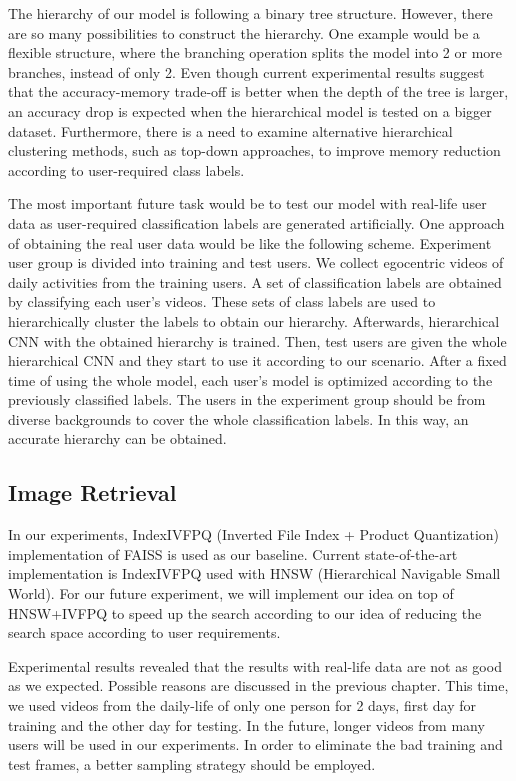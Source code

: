The hierarchy of our model is following a binary tree structure. 
However, there are so many possibilities to construct the hierarchy. 
One example would be a flexible structure, where the branching operation splits the model into 2 or more branches, instead of only 2. 
Even though current experimental results suggest that the accuracy-memory trade-off is better when the depth of the tree is larger, an accuracy drop is expected when the hierarchical model is tested on a bigger dataset.
Furthermore, there is a need to examine alternative hierarchical clustering methods, such as top-down approaches, to improve memory reduction according to user-required class labels.

The most important future task would be to test our model with real-life user data as user-required classification labels are generated artificially.
One approach of obtaining the real user data would be like the following scheme.
Experiment user group is divided into training and test users. 
We collect egocentric videos of daily activities from the training users.
A set of classification labels are obtained by classifying each user's videos.
These sets of class labels are used to hierarchically cluster the labels to obtain our hierarchy. 
Afterwards, hierarchical CNN with the obtained hierarchy is trained. 
Then, test users are given the whole hierarchical CNN and they start to use it according to our scenario. 
After a fixed time of using the whole model, each user's model is optimized according to the previously classified labels.
The users in the experiment group should be from diverse backgrounds to cover the whole classification labels. 
In this way, an accurate hierarchy can be obtained.


\subsection*{Image Retrieval}

In our experiments, IndexIVFPQ (Inverted File Index + Product Quantization) implementation of FAISS is used as our baseline. 
Current state-of-the-art implementation is IndexIVFPQ used with HNSW (Hierarchical Navigable Small World). 
For our future experiment, we will implement our idea on top of HNSW+IVFPQ to speed up the search according to our idea of reducing the search space according to user requirements.

Experimental results revealed that the results with real-life data are not as good as we expected. 
Possible reasons are discussed in the previous chapter. 
This time, we used videos from the daily-life of only one person for 2 days, first day for training and the other day for testing. 
In the future, longer videos from many users will be used in our experiments.
In order to eliminate the bad training and test frames, a better sampling strategy should be employed.

